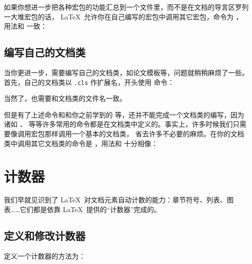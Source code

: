 如果你想进一步把各种宏包的功能汇总到一个文件里，而不是在文档的导言区罗列一大堆宏包的话，
\LaTeX\ 允许你在自己编写的宏包中调用其它宏包，命令为 ，用法和 
一致：
\begin{command}
\end{command}

\subsection{编写自己的文档类}\label{subsec:provide-cls}

当你更进一步，需要编写自己的文档类，如论文模板等，问题就稍稍麻烦了一些。首先，自己的文档类以 \texttt{.cls} 作扩展名，开头使用
 命令：
\begin{command}
\end{command}
当然了，也需要和文档类的文件名一致。

但是有了上述命令和和你之前学到的  等，还并不能完成一个文档类的编写，因为诸如 、
 等等许多常用的命令都是在文档类中定义的。事实上，许多时候我们只需要像调用宏包那样调用一个基本的文档类，
省去许多不必要的麻烦。在你的文档类中调用其它文档类的命令是  ，用法和  十分相像：
\begin{command}
\end{command}

\section{计数器}\label{sec:counters}

我们早就见识到了 \LaTeX\ 对文档元素自动计数的能力：章节符号、列表、图表……它们都是依靠 \LaTeX\ 提供的“计数器”完成的。

\subsection{定义和修改计数器}\label{subsec:count-defs}

定义一个计数器的方法为：
\begin{command}
 \\
\end{command}

